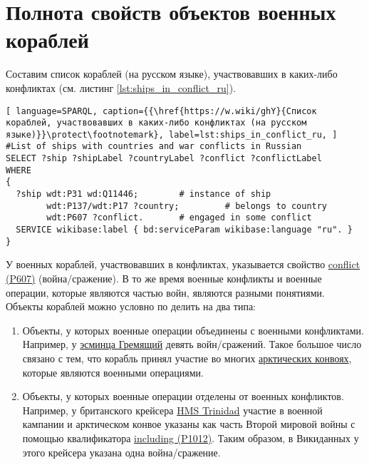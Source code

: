 \section{Полнота свойств объектов военных кораблей}

Составим список кораблей (на русском языке), участвовавших в каких-либо конфликтах (см. листинг \ref{lst:ships_in_conflict_ru}).

\begin{lstlisting}[ language=SPARQL, caption={{\href{https://w.wiki/ghY}{Список кораблей, участвовавших в каких-либо конфликтах (на русском языке)}}\protect\footnotemark}, label=lst:ships_in_conflict_ru, ]
#List of ships with countries and war conflicts in Russian
SELECT ?ship ?shipLabel ?countryLabel ?conflict ?conflictLabel
WHERE
{
  ?ship wdt:P31 wd:Q11446;        # instance of ship
        wdt:P137/wdt:P17 ?country;         # belongs to country
        wdt:P607 ?conflict.       # engaged in some conflict
  SERVICE wikibase:label { bd:serviceParam wikibase:language "ru". }
}
\end{lstlisting}

У военных кораблей, участвовавших в конфликтах, указывается свойство \href{https://www.wikidata.org/wiki/Property:P607}{conflict (P607)} (война/сражение). В то же время военные конфликты и военные операции, которые являются частью войн, являются разными понятиями. Объекты кораблей можно условно по делить на два типа:

\begin{enumerate}
  \item Объекты, у которых военные операции объединены с военными конфликтами. Например, у \href{https://www.wikidata.org/wiki/Q4148613}{эсминца Гремящий} девять войн/сражений. Такое большое число связано с тем, что корабль принял участие во многих \href{https://ru.wikipedia.org/wiki/Арктические_конвои}{арктических конвоях}, которые являются военными операциями.
  \item Объекты, у которых военные операции отделены от военных конфликтов. Например, у британского крейсера \href{https://ru.wikipedia.org/wiki/HMS_Trinidad_(1940)}{HMS Trinidad} участие в военной кампании и арктическом конвое указаны как часть Второй мировой войны с помощью квалификатора \href{https://www.wikidata.org/wiki/Property:P1012}{including (P1012)}. Таким образом, в Викиданных у этого крейсера указана одна война/сражение.
\end{enumerate}

